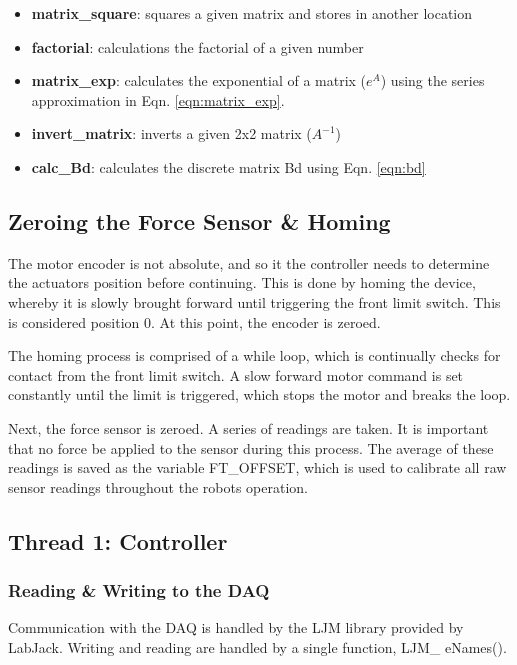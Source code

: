 \documentclass{article}
\begin{document}
	\begin{itemize}
		\item \textbf{matrix\_square}: squares a given matrix and stores in another location
		\item  \textbf{factorial}: calculations the factorial of a given number
		\item  \textbf{matrix\_exp}: calculates the exponential of a matrix ($e^A$) using the series approximation in Eqn. \ref{eqn:matrix_exp}.
		\item  \textbf{invert\_matrix}: inverts a given 2x2 matrix ($A^{-1}$)
		\item  \textbf{calc\_Bd}: calculates the discrete matrix Bd using Eqn. \ref{eqn:bd}
		
	\end{itemize}
	
	\subsection{Zeroing the Force Sensor \& Homing}
	
	The motor encoder is not absolute, and so it the controller needs to determine the actuators position before continuing. This is done by homing the device, whereby it is slowly brought forward until triggering the front limit switch. This is considered position 0. At this point, the encoder is zeroed. 
	
	The homing process is comprised of a while loop, which is continually checks for contact from the front limit switch. A slow forward motor command is set constantly until the limit is triggered, which stops the motor and breaks the loop. 
	
	Next, the force sensor is zeroed. A series of readings are taken. It is important that no force be applied to the sensor during this process. The average of these readings is saved as the variable FT\_OFFSET, which is used to calibrate all raw sensor readings throughout the robots operation.
	
	\subsection{Thread 1: Controller}
	
	\subsubsection{Reading \& Writing to the DAQ}

	Communication with the DAQ is handled by the LJM library provided by LabJack. Writing and reading are handled by a single function, LJM\_ eNames().
	
\end{document}
